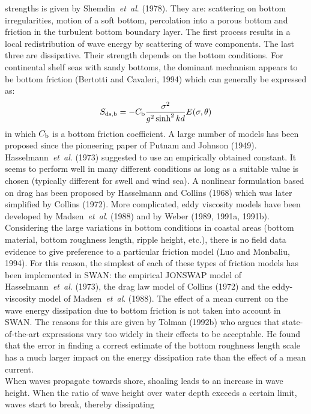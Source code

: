 \documentclass[12pt]{book}
\begin{document}
strengths is given by Shemdin~{\it et~al}. (1978). They are: scattering on bottom irregularities,
motion of a soft bottom, percolation into a porous bottom and friction in the turbulent bottom
boundary layer. The first process results in a local redistribution of wave energy by
scattering of wave components. The last three are dissipative. Their strength depends on the
bottom conditions. For continental shelf seas with sandy bottoms, the dominant mechanism appears
to be bottom friction (Bertotti and Cavaleri, 1994) which can generally be expressed as:
\begin{equation}
  S_{\rm ds,b} = -C_{\rm b} \frac{\sigma^2}{g^2 \sinh^2 kd} E (\sigma,\theta)
  \label{eq2-7}
\end{equation}
in which $C_{\rm b}$ is a bottom friction coefficient. A large number of models has been proposed since the
pioneering paper of Putnam and Johnson (1949). Hasselmann~{\it et~al}. (1973) suggested to use an empirically
obtained constant. It seems to perform well in many different conditions as long as a suitable value is chosen
(typically different for swell and wind sea). A nonlinear formulation based on drag has been proposed by Hasselmann
and Collins (1968) which was later simplified by Collins (1972). More complicated, eddy viscosity models have been
developed by Madsen~{\it et~al}. (1988) and by Weber (1989, 1991a, 1991b). Considering the large variations in
bottom conditions in coastal areas (bottom material, bottom roughness length, ripple height, etc.), there
is no field data evidence to give preference to a particular friction model (Luo and Monbaliu, 1994). For
this reason, the simplest of each of these types of friction models has been implemented in SWAN: the
empirical JONSWAP model of Hasselmann~{\it et~al}. (1973), the drag law model of Collins (1972) and the
eddy-viscosity model of Madsen~{\it et~al}. (1988). The effect of a mean current on the wave energy dissipation
due to bottom friction is not taken into account in SWAN. The reasons for this are given by Tolman (1992b)
who argues that state-of-the-art expressions vary too widely in their effects to be acceptable. He found that
the error in finding a correct estimate of the bottom roughness length scale has a much larger impact on
the energy dissipation rate than the effect of a mean current.
\nocite{She78HHH,Ber94C,Put49J,JON73,Has68C,Col72,Mad88PG,Web89,Web91a,Web91b,Luo94M}
\\[2ex]
\noindent
When waves propagate towards shore, shoaling leads to an increase in wave height. When the ratio
of wave height over water depth exceeds a certain limit, waves start to break, thereby dissipating
\end{document}
